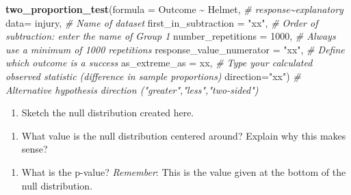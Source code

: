 \documentclass[
]{report}
\newenvironment{Shaded}{\begin{snugshade}}{\end{snugshade}}
\newcommand{\CommentTok}[1]{\textcolor[rgb]{0.56,0.35,0.01}{\textit{#1}}}
\newcommand{\DataTypeTok}[1]{\textcolor[rgb]{0.13,0.29,0.53}{#1}}
\newcommand{\DecValTok}[1]{\textcolor[rgb]{0.00,0.00,0.81}{#1}}
\newcommand{\KeywordTok}[1]{\textcolor[rgb]{0.13,0.29,0.53}{\textbf{#1}}}
\newcommand{\NormalTok}[1]{#1}
\newcommand{\OperatorTok}[1]{\textcolor[rgb]{0.81,0.36,0.00}{\textbf{#1}}}
\newcommand{\StringTok}[1]{\textcolor[rgb]{0.31,0.60,0.02}{#1}}
\providecommand{\tightlist}{%
  \setlength{\itemsep}{0pt}\setlength{\parskip}{0pt}}
\begin{document}
\begin{Shaded}
\begin{Highlighting}[]
\KeywordTok{two\_proportion\_test}\NormalTok{(}\DataTypeTok{formula =}\NormalTok{ Outcome }\OperatorTok{\textasciitilde{}}\StringTok{ }\NormalTok{Helmet, }\CommentTok{\# response\textasciitilde{}explanatory}
                    \DataTypeTok{data=}\NormalTok{ injury, }\CommentTok{\# Name of dataset}
                    \DataTypeTok{first\_in\_subtraction =} \StringTok{"xx"}\NormalTok{, }\CommentTok{\# Order of subtraction: enter the name of Group 1}
                    \DataTypeTok{number\_repetitions =} \DecValTok{1000}\NormalTok{, }\CommentTok{\# Always use a minimum of 1000 repetitions}
                    \DataTypeTok{response\_value\_numerator =} \StringTok{"xx"}\NormalTok{, }\CommentTok{\# Define which outcome is a success }
                    \DataTypeTok{as\_extreme\_as =}\NormalTok{ xx, }\CommentTok{\# Type your calculated observed statistic (difference in sample proportions)}
                    \DataTypeTok{direction=}\StringTok{"xx"}\NormalTok{) }\CommentTok{\# Alternative hypothesis direction ("greater","less","two{-}sided")}
\end{Highlighting}
\end{Shaded}

\begin{enumerate}
\def\labelenumi{\arabic{enumi}.}
\setcounter{enumi}{4}
\tightlist
\item
  Sketch the null distribution created here.
\end{enumerate}

\newpage

\begin{enumerate}
\def\labelenumi{\arabic{enumi}.}
\setcounter{enumi}{5}
\tightlist
\item
  What value is the null distribution centered around? Explain why this makes sense?
\end{enumerate}

\vspace{1in}

\begin{enumerate}
\def\labelenumi{\arabic{enumi}.}
\setcounter{enumi}{6}
\tightlist
\item
  What is the p-value? \emph{Remember}: This is the value given at the bottom of the null distribution.
\end{enumerate}

\vspace{0.2in}
\end{document}
